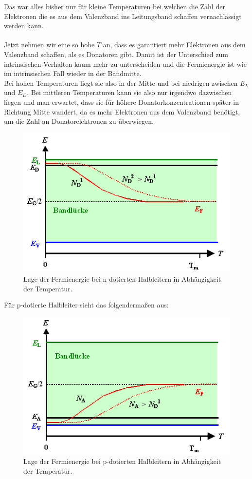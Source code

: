 \documentclass[paper=a4,10pt]{scrartcl}
\begin{document}
Das war alles bisher nur für kleine Temperaturen bei welchen die Zahl der Elektronen die es aus dem Valenzband ins Leitungsband schaffen vernachlässigt werden kann. \\\\
Jetzt nehmen wir eine so hohe $T$ an, dass es garantiert mehr Elektronen aus dem Valenzband schaffen, als es Donatoren gibt. Damit ist der Unterschied zum intrinsischen Verhalten kaum mehr zu unterscheiden und die Fermienergie ist wie im intrinsischen Fall wieder in der Bandmitte.\\
Bei hohen Temperaturen liegt sie also in der Mitte und bei niedrigen zwischen $E_L$ und $E_D$. Bei mittleren Temperaturen kann sie also nur irgendwo dazwischen liegen und man erwartet, dass sie für höhere Donatorkonzentrationen später in Richtung Mitte wandert, da es mehr Elektronen aus dem Valenzband benötigt, um die Zahl an Donatorelektronen zu überwiegen.

\begin{figure}[H]
\centering
\includegraphics[scale=0.7]{../bilder/fermi_temperatur.png}
\caption{Lage der Fermienergie bei n-dotierten Halbleitern in Abhängigkeit der Temperatur.}
\label{fig:fermi_n}
\end{figure}

Für p-dotierte Halbleiter sieht das folgendermaßen aus:

\begin{figure}[H]
\centering
\includegraphics[scale=0.7]{../bilder/fermi_temperatur2.png}
\caption{Lage der Fermienergie bei p-dotierten Halbleitern in Abhängigkeit der Temperatur.}
\label{fig:fermi_p}
\end{figure}
\end{document}
